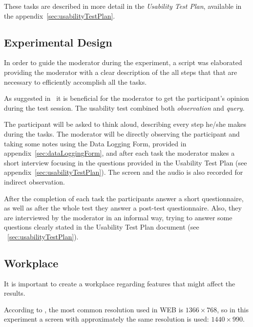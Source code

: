 \documentclass[a4paper]{article}
\begin{document}
These tasks are described in more detail in the \emph{Usability Test Plan}, available in the appendix~\ref{sec:usabilityTestPlan}.


\subsection{Experimental Design}

In order to guide the moderator during the experiment, a script was elaborated providing the moderator with a clear description of the all steps that that are necessary to efficiently accomplish all the tasks.


As suggested in~\citep{mitchell2007step} it is beneficial for the moderator to get the participant's opinion during the test session.
The usability test combined both \emph{observation} and \textit{query}.

 The participant will be asked to think aloud, describing every step he/she makes during the tasks. The moderator will be directly observing the participant and taking some notes using the Data Logging Form, provided in appendix~\ref{sec:dataLoggingForm}, and after each task the moderator makes a short interview focusing in the questions provided in the Usability Test Plan (see appendix~\ref{sec:usabilityTestPlan}). The screen and the audio is also recorded for indirect observation.

 After the completion of each task the participants answer a short questionnaire, as well as after the whole test they answer a post-test questionnaire. Also, they are interviewed by the moderator in an informal way, trying to answer some questions clearly stated in the Usability Test Plan document (see ~\ref{sec:usabilityTestPlan}). 



\subsection{Workplace}
It is important to create a workplace regarding features that might affect the results.

According to \citep{http://www.satya-weblog.com/2013/07/desktop-laptop-mobile-screen-resolution-most-common-worldwide.html}, the most common resolution used in WEB is $1366\times 768$, so in this experiment a screen with approximately the same resolution is used: $1440\times 990$.
\end{document}
